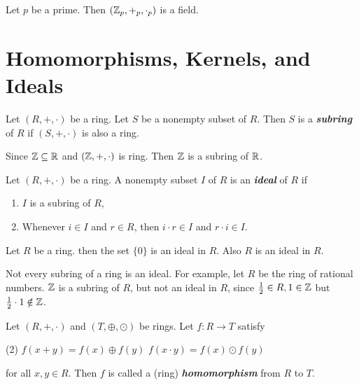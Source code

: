 \begin{example}
    Let \(p\) be a prime. Then \((\mathbb{Z}_p,+_p,\cdot_p)\) is a field.
\end{example}

\section{Homomorphisms, Kernels, and Ideals}

\begin{mydef}
    Let \((R,+,\cdot)\) be a ring. Let \(S\) be a nonempty subset of \(R\). Then \(S\) is a \textit{\textbf{subring}} of \(R\) if \((S,+,\cdot)\) is also a ring.
\end{mydef}

\begin{example}
    Since \(\mathbb{Z} \subseteq \mathbb{R}\) and \((\mathbb{Z},+,\cdot)\) is ring. Then \(\mathbb{Z}\) is a subring of \(\mathbb{R}\).
\end{example}

\begin{mydef}
    Let \((R,+,\cdot)\) be a ring. A nonempty subset \(I\) of \(R\) is an \textit{\textbf{ideal}} of \(R\) if
    \begin{enumerate}
    \item \(I\) is a subring of \(R\),
    
    \item  Whenever \(i \in I\) and \(r \in R\), then \(i\cdot r \in I\) and \(r\cdot i \in I\).
    \end{enumerate}
\end{mydef}

\begin{example}
    Let \(R\) be a ring. then the set \(\{0\}\) is an ideal in \(R\). Also \(R\) is an ideal in \(R\).
\end{example}

\begin{example}
    Not every subring of a ring is an ideal. For example, let \(R\) be the ring of rational numbers. \(\mathbb{Z}\) is a subring of \(R\), but not an ideal in \(R\), since \(\frac{1}{2}\in R,1\in \mathbb{Z}\) but \(\frac{1}{2}\cdot 1 \notin \mathbb{Z}\).
\end{example}

\begin{mydef}
    Let \((R,+,\cdot)\) and \((T,\oplus,\odot)\) be rings. Let \(f:R \longrightarrow T\) satisfy
    \begin{tasks}(2)
    \task \(f(x+y)=f(x)\oplus f(y)\)
    \task \(f(x\cdot y)=f(x)\odot f(y)\)
    \end{tasks}
    for all \(x,y \in R\). Then \(f\) is called a (ring) 
    \textit{\textbf{homomorphism}} from \(R\) to \(T\).
\end{mydef}

